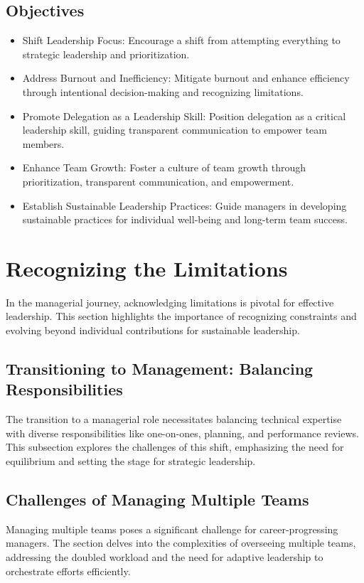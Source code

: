 \documentclass[10pt]{article}
\begin{document}
\subsection{Objectives}
\begin{itemize}
    \item Shift Leadership Focus: Encourage a shift from attempting everything to strategic leadership and prioritization.
    \item Address Burnout and Inefficiency: Mitigate burnout and enhance efficiency through intentional decision-making and recognizing limitations.
    \item Promote Delegation as a Leadership Skill: Position delegation as a critical leadership skill, guiding transparent communication to empower team members.
    \item Enhance Team Growth: Foster a culture of team growth through prioritization, transparent communication, and empowerment.
    \item Establish Sustainable Leadership Practices: Guide managers in developing sustainable practices for individual well-being and long-term team success.
\end{itemize}

\section{Recognizing the Limitations}
In the managerial journey, acknowledging limitations is pivotal for effective leadership. This section highlights the importance of recognizing constraints and evolving beyond individual contributions for sustainable leadership.

\subsection{Transitioning to Management: Balancing Responsibilities}
The transition to a managerial role necessitates balancing technical expertise with diverse responsibilities like one-on-ones, planning, and performance reviews. This subsection explores the challenges of this shift, emphasizing the need for equilibrium and setting the stage for strategic leadership.

\subsection{Challenges of Managing Multiple Teams}
Managing multiple teams poses a significant challenge for career-progressing managers. The section delves into the complexities of overseeing multiple teams, addressing the doubled workload and the need for adaptive leadership to orchestrate efforts efficiently.
\end{document}
